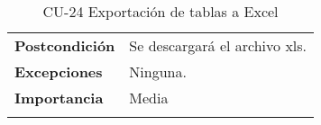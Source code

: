 \begin{longtable}[t]{@{}ll@{}}
\begin{minipage}[t]{0.23\columnwidth}
\textbf{Postcondición}\strut
\end{minipage} & \begin{minipage}[t]{0.71\columnwidth}\raggedright\strut
Se descargará el archivo xls.\strut
\end{minipage}\tabularnewline
\begin{minipage}[t]{0.23\columnwidth}\raggedright\strut
\textbf{Excepciones}\strut
\end{minipage} & \begin{minipage}[t]{0.71\columnwidth}\raggedright\strut
Ninguna. \strut
\end{minipage}\tabularnewline
\begin{minipage}[t]{0.23\columnwidth}\raggedright\strut
\textbf{Importancia}\strut
\end{minipage} & \begin{minipage}[t]{0.71\columnwidth}\raggedright\strut
Media\strut
\end{minipage}\tabularnewline
\bottomrule
\caption{CU-24 Exportación de tablas a Excel}
\end{longtable}

